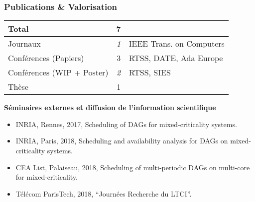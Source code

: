 \documentclass[xcolor=table]{beamer}
\begin{document}
%			
%			

\begin{frame}
	\frametitle{Publications \& Valorisation}
	\begin{table}[]
		\begin{tabular}{|l|c|l|}
			\hline
			\rowcolor[HTML]{DAE8FC} 
			Total                      & 7          &                          \\ \hline
			Journaux                   & \textit{1} & IEEE Trans. on Computers \\ \hline
			Conférences (Papiers)      & 3          & RTSS, DATE, Ada Europe   \\ \hline
			Conférences (WIP + Poster) & \textit{2} & RTSS, SIES               \\ \hline
			Thèse                      & 1          &                          \\ \hline
		\end{tabular}
	\end{table}
	\textbf{Séminaires externes et diffusion de l'information scientifique}
	\begin{itemize}
        \item INRIA, Rennes, 2017, Scheduling of DAGs for mixed-criticality systems.
		\item INRIA, Paris, 2018, Scheduling and availability analysis for DAGs on 
		mixed-criticality systems.
		\item CEA List, Palaiseau, 2018, Scheduling of multi-periodic DAGs on 
		multi-core for mixed-criticality.
		\item T\'{e}l\'{e}com ParisTech, 2018, ``Journ\'{e}es Recherche du LTCI''.
	\end{itemize}
\end{frame}
\end{document}

